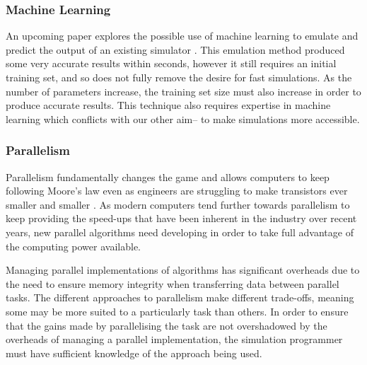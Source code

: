 \documentclass{UoYCSproject}
\begin{document}
\subsubsection{Machine Learning}
An upcoming paper explores the possible use of machine learning to emulate and predict the output of an existing simulator \cite{kieran_machine_learning}.
This emulation method produced some very accurate results within seconds, however it still requires an initial training set, and so does not fully remove the desire for fast simulations.
As the number of parameters increase, the training set size must also increase in order to produce accurate results.
This technique also requires expertise in machine learning which conflicts with our other aim-- to make simulations more accessible.



\subsubsection{Parallelism}
Parallelism fundamentally changes the game and allows computers to keep following Moore's law even as engineers are struggling to make transistors ever smaller and smaller \cite{concurrency_revolution}.
As modern computers tend further towards parallelism to keep providing the speed-ups that have been inherent in the industry over recent years, new parallel algorithms need developing in order to take full advantage of the computing power available.

Managing parallel implementations of algorithms has significant overheads due to the need to ensure memory integrity when transferring data between parallel tasks.
The different approaches to parallelism make different trade-offs, meaning some may be more suited to a particularly task than others.
In order to ensure that the gains made by parallelising the task are not overshadowed by the overheads of managing a parallel implementation, the simulation programmer must have sufficient knowledge of the approach being used.
\end{document}
